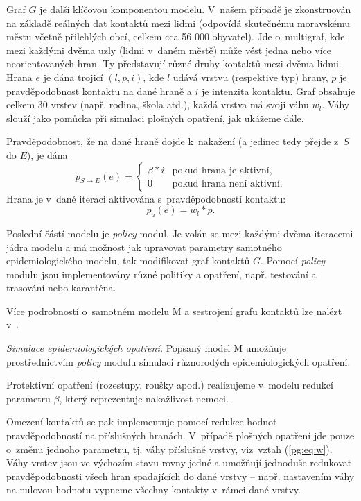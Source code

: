 Graf $G$ je další klíčovou komponentou modelu. V~našem případě je
zkonstruován na základě reálných dat kontaktů mezi lidmi (odpovídá
skutečnému moravskému městu včetně přilehlých obcí, celkem cca 56 000
obyvatel). Jde o~multigraf, kde mezi každými dvěma uzly (lidmi v~daném
městě) může vést jedna nebo více neorientovaných hran. Ty představují
různé druhy kontaktů mezi dvěma lidmi. Hrana $e$ je dána trojicí $(l,
p, i)$, kde $l$ udává vrstvu (respektive typ) hrany, $p$ je pravděpodobnost
kontaktu na dané hraně a $i$ je intenzita kontaktu. Graf
obsahuje celkem 30 vrstev (např. rodina, škola atd.), každá vrstva má svoji
váhu $w_l$. Váhy slouží jako pomůcka při simulaci plošných opatření,
jak ukážeme dále.

Pravděpodobnost, že na dané hraně dojde k~nakažení (a jedinec tedy přejde z~$S$
do $E$), je dána
\begin{equation}
  p_{S \rightarrow E}(e) = \begin{cases}
    \beta * i  & \mbox{pokud hrana je aktivní,} \\
    0          & \mbox{pokud hrana není aktivní.} 
    \end{cases}
\end{equation}
Hrana je v~dané iteraci aktivována s~pravděpodobností kontaktu:
\begin{equation}
\label{pg:eq:w}
p_a(e) = w_l * p.
\end{equation}

Poslední částí modelu je {\em policy} modul. Je volán se mezi každými dvěma
iteracemi jádra modelu a má možnost jak upravovat parametry samotného
epidemiologického modelu, tak modifikovat graf kontaktů $G$. Pomocí {\em policy} modulu
jsou implementovány různé politiky a opatření, např. testování a
trasování nebo karanténa. 

Více podrobností o~samotném modelu M a sestrojení grafu kontaktů lze nalézt v~\cite{M-techrep2021}.

\emph{Simulace epidemiologických opatření.} Popsaný model M umožňuje prostřednictvím {\em policy} modulu simulaci různorodých epidemiologických opatření.

Protektivní opatření (rozestupy, roušky apod.) realizujeme v~modelu
redukcí parametru $\beta$, který reprezentuje nakažlivost nemoci.

Omezení kontaktů se pak implementuje pomocí redukce hodnot
prav\-dě\-po\-dob\-nos\-tí na příslušných hranách. V~případě plošných opatření
jde pouze o~změnu jednoho parametru, tj. váhy příslušné vrstvy,
viz~vztah (\ref{pg:eq:w}). Váhy vrstev jsou ve výchozím stavu rovny jedné a
umožňují jednoduše redukovat pravděpodobnosti všech hran spadajících
do dané vrstvy --  např. nastavením váhy na nulovou hodnotu vypneme
všechny kontakty v~rámci dané vrstvy.

